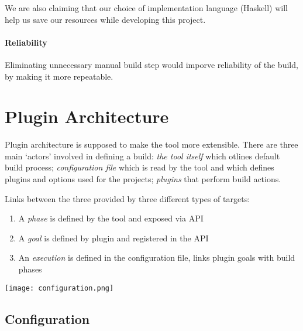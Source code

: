 \documentclass[11pt]{article}
\begin{document}
We are also claiming that our choice of implementation language (Haskell) will
help us save our resources while developing this project.

\paragraph{Reliability}
Eliminating unnecessary manual build step would imporve reliability of the
build, by making it more repeatable. 

\section{Plugin Architecture}
Plugin architecture is supposed to make the tool more extensible. There are
three main `actors' involved in defining a build: \textit{the tool itself}
which otlines default build process; \textit{configuration file} which is read
by the tool and which defines plugins and options used for the projects;
\textit{plugins} that perform build actions.

Links between the three provided by three different types of targets:
\begin{enumerate}
\item A \textit{phase} is defined by the tool and exposed via API
\item A \textit{goal} is defined by plugin and registered in the API
\item An \textit{execution} is defined in the configuration file, links plugin goals with build phases
\end{enumerate}

\texttt{[image: configuration.png]}

\subsection{Configuration}
\end{document}
